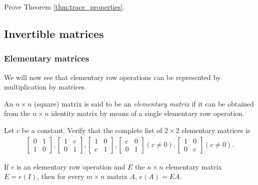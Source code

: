 \documentclass[12pt,letterpaper,reqno]{article}
\numberwithin{equation}{section}
\begin{document}
\begin{exercise}
Prove Theorem \ref{thm:trace_properties}.	
\end{exercise}

\subsection{Invertible matrices}
\subsubsection{Elementary matrices}
We will now see that elementary row operations can be represented by multiplication by matrices. 

\begin{defn}\label{def:elementary_matrix}
	An $n \times n$ (square) matrix is said to be an \emph{elementary matrix} if it can be obtained from the $n \times n$ identity matrix by means of a single elementary row operation.
\end{defn}

\begin{exercise}\label{ex:2_by_2_elementary_matrices}
Let $c$ be a constant. Verify that the complete list of $2 \times 2$ elementary matrices is 
	\begin{align*}
	\begin{bmatrix}
		0 & 1 \\ 1 & 0
	\end{bmatrix}, \begin{bmatrix}
		1 & c \\ 0 & 1
	\end{bmatrix}, \begin{bmatrix}
		1 & 0 \\ c & 1
	\end{bmatrix}, 
	 \begin{bmatrix}
		c & 0 \\ 0 & 1
	\end{bmatrix} (c \neq 0), \begin{bmatrix}
		1 & 0 \\ 0 & c
	\end{bmatrix} (c \neq 0).
\end{align*}
\end{exercise}

\begin{thm}
If $e$ is an elementary row operation and $E$ the $n \times n$ elementary matrix $E=e(I)$, then for every $m \times n$ matrix $A$, $e(A)=EA$.	
\end{thm}
\end{document}
